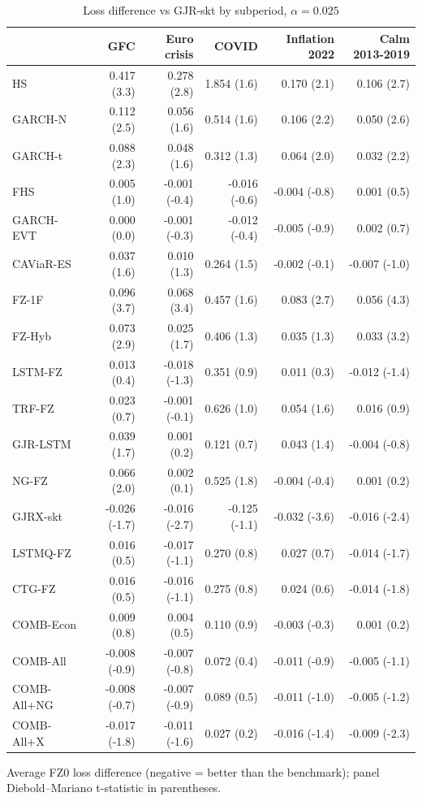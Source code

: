 \begin{table}[htbp]
\centering
\footnotesize
\caption{Loss difference vs GJR-skt by subperiod, $\alpha=0.025$}
\label{tab:sub}
\begin{tabular}{lrrrrr}
\toprule
 & GFC & Euro crisis & COVID & Inflation 2022 & Calm 2013-2019 \\
\midrule
HS & 0.417 (3.3) & 0.278 (2.8) & 1.854 (1.6) & 0.170 (2.1) & 0.106 (2.7) \\
GARCH-N & 0.112 (2.5) & 0.056 (1.6) & 0.514 (1.6) & 0.106 (2.2) & 0.050 (2.6) \\
GARCH-t & 0.088 (2.3) & 0.048 (1.6) & 0.312 (1.3) & 0.064 (2.0) & 0.032 (2.2) \\
FHS & 0.005 (1.0) & -0.001 (-0.4) & -0.016 (-0.6) & -0.004 (-0.8) & 0.001 (0.5) \\
GARCH-EVT & 0.000 (0.0) & -0.001 (-0.3) & -0.012 (-0.4) & -0.005 (-0.9) & 0.002 (0.7) \\
CAViaR-ES & 0.037 (1.6) & 0.010 (1.3) & 0.264 (1.5) & -0.002 (-0.1) & -0.007 (-1.0) \\
FZ-1F & 0.096 (3.7) & 0.068 (3.4) & 0.457 (1.6) & 0.083 (2.7) & 0.056 (4.3) \\
FZ-Hyb & 0.073 (2.9) & 0.025 (1.7) & 0.406 (1.3) & 0.035 (1.3) & 0.033 (3.2) \\
LSTM-FZ & 0.013 (0.4) & -0.018 (-1.3) & 0.351 (0.9) & 0.011 (0.3) & -0.012 (-1.4) \\
TRF-FZ & 0.023 (0.7) & -0.001 (-0.1) & 0.626 (1.0) & 0.054 (1.6) & 0.016 (0.9) \\
GJR-LSTM & 0.039 (1.7) & 0.001 (0.2) & 0.121 (0.7) & 0.043 (1.4) & -0.004 (-0.8) \\
NG-FZ & 0.066 (2.0) & 0.002 (0.1) & 0.525 (1.8) & -0.004 (-0.4) & 0.001 (0.2) \\
GJRX-skt & -0.026 (-1.7) & -0.016 (-2.7) & -0.125 (-1.1) & -0.032 (-3.6) & -0.016 (-2.4) \\
LSTMQ-FZ & 0.016 (0.5) & -0.017 (-1.1) & 0.270 (0.8) & 0.027 (0.7) & -0.014 (-1.7) \\
CTG-FZ & 0.016 (0.5) & -0.016 (-1.1) & 0.275 (0.8) & 0.024 (0.6) & -0.014 (-1.8) \\
COMB-Econ & 0.009 (0.8) & 0.004 (0.5) & 0.110 (0.9) & -0.003 (-0.3) & 0.001 (0.2) \\
COMB-All & -0.008 (-0.9) & -0.007 (-0.8) & 0.072 (0.4) & -0.011 (-0.9) & -0.005 (-1.1) \\
COMB-All+NG & -0.008 (-0.7) & -0.007 (-0.9) & 0.089 (0.5) & -0.011 (-1.0) & -0.005 (-1.2) \\
COMB-All+X & -0.017 (-1.8) & -0.011 (-1.6) & 0.027 (0.2) & -0.016 (-1.4) & -0.009 (-2.3) \\
\bottomrule
\end{tabular}
\par\smallskip\parbox{\linewidth}{\scriptsize Average FZ0 loss difference (negative = better than the benchmark); panel Diebold--Mariano t-statistic in parentheses.}
\end{table}